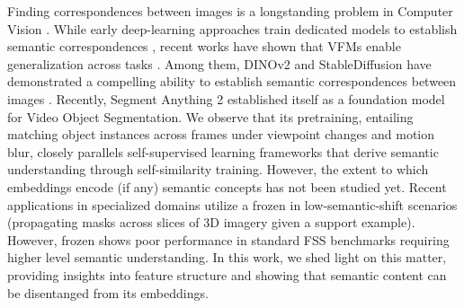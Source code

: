 Finding correspondences between images is a longstanding problem in Computer Vision  \cite{bay2006surf, lowe2004distinctive, kim2017fcss, rocco2018weakly, ofri2023neural}. While early deep-learning approaches train dedicated models to establish semantic correspondences \cite{kim2017fcss, rocco2018weakly}, recent works \cite{zhang2023tale, tang2023emergent} have shown that VFMs enable generalization across tasks \cite{tumanyan2022splicing, awais2025foundation, wei2024stronger, cuttano2025samwise}. Among them, DINOv2 \cite{oquab2023dinov2} and StableDiffusion \cite{rombach2022diffusion} have demonstrated a compelling ability to establish semantic correspondences between images \cite{zhang2023tale, ofri2023neural, zhang2024telling}.
Recently, Segment Anything 2 \cite{ravi2024sam} established itself as a foundation model for Video Object Segmentation. We observe that its pretraining, entailing matching object instances across frames under viewpoint changes and motion blur, closely parallels self-supervised learning frameworks \cite{yang2022inscon, yang2021instance, henaff2021efficient} that derive semantic understanding through self-similarity training. However, the extent to which \sam{} embeddings encode (if any) semantic concepts has not been studied yet. Recent applications in specialized domains \cite{zu2025medicalsam, bai2024medicalsam} utilize a frozen \sam{} in low-semantic-shift scenarios (\eg propagating masks across slices of 3D imagery given a support example). However, frozen \sam{} shows poor performance in standard FSS benchmarks requiring higher level semantic understanding. In this work, we shed light on this matter, providing insights into \sam{} feature structure and showing that semantic content can be disentanged from its embeddings.

